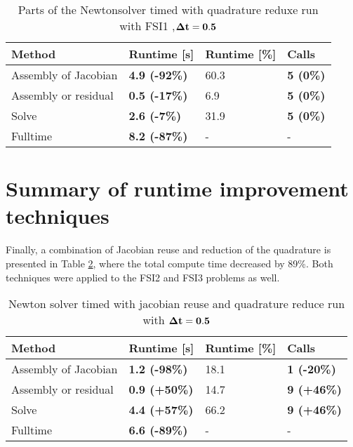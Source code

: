 \begin{table}[H]
\centering
\caption{Parts of the Newtonsolver timed with quadrature reduxe run with FSI1 ,$\bold{\Delta t = 0.5}$}
\label{tab:quadreduce}
\begin{tabular}{|l|l|l|l|}
\hline
Method & \textbf{Runtime {[}s{]}} & Runtime {[}\%{]} & \textbf{Calls} \\ \hline
Assembly of Jacobian & \textbf{4.9 (-92\%)} & 60.3 & \textbf{5 (0\%)} \\ \hline
Assembly or residual & \textbf{0.5 (-17\%)} & 6.9 & \textbf{5 (0\%)} \\ \hline
Solve & \textbf{2.6 (-7\%)} & 31.9 & \textbf{5 (0\%)} \\ \hline
Fulltime & \textbf{8.2 (-87\%)} & - & - \\ \hline
\end{tabular}
\end{table}


\section{Summary of runtime improvement techniques}
Finally, a combination of Jacobian reuse and reduction of the quadrature is presented in Table \ref{both_tech}, where the total compute time decreased by 89\%. Both techniques were applied to the  FSI2 and FSI3 problems as well.

\begin{table}[H]
\centering
\caption{Newton solver timed with jacobian reuse and quadrature reduce run with $\bold{\Delta t = 0.5}$}
\label{both_tech}
\begin{tabular}{|l|l|l|l|}
\hline
Method & \textbf{Runtime {[}s{]}} & Runtime {[}\%{]} & \textbf{Calls} \\ \hline
Assembly of Jacobian & \textbf{1.2 (-98\%)} & 18.1 & \textbf{1 (-20\%)} \\ \hline
Assembly or residual & \textbf{0.9 (+50\%)} & 14.7 & \textbf{9 (+46\%)} \\ \hline
Solve & \textbf{4.4 (+57\%)} & 66.2 & \textbf{9 (+46\%)} \\ \hline
Fulltime & \textbf{6.6 (-89\%)} & - & - \\ \hline
\end{tabular}
\end{table}















